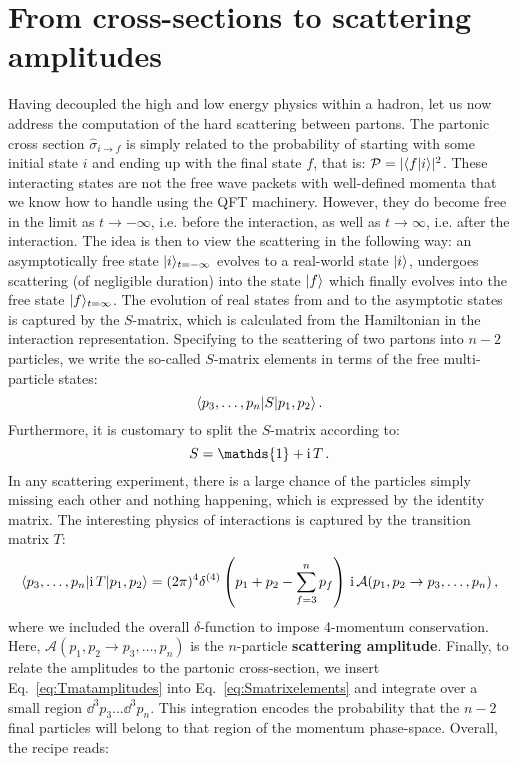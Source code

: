 \documentclass[main.tex]{subfiles}
\begin{document}
\section{From cross-sections to scattering amplitudes} \label{sec:fromcrosssectoamps}
Having decoupled the high and low energy physics within a hadron, let us now address the computation of the hard scattering between partons. The partonic cross section $\hat{\sigma}_{i\rightarrow f}$ is simply related to the probability of starting with some initial state $i$ and ending up with the final state $f$, that is: $\mathcal{P} = |\langle f|i \rangle|^2$. These interacting states are not the free wave packets with well-defined momenta that we know how to handle using the QFT machinery. However, they do become free in the limit as $t\rightarrow -\infty$, i.e. before the interaction, as well as $t \rightarrow \infty$, i.e. after the interaction. The idea is then to view the scattering in the following way: an asymptotically free state $|i \rangle_{t=-\infty}$ evolves to a real-world state $|i \rangle$, undergoes scattering (of negligible duration) into the state $|f \rangle$ which finally evolves into the free state $|f \rangle_{t=\infty}$. The evolution of real states from and to the asymptotic states is captured by the $S$-matrix, which is calculated from the Hamiltonian in the interaction representation. Specifying to the scattering of two partons into $n-2$ particles, we write the so-called $S$-matrix elements in terms of the free multi-particle states:
\begin{equation} \label{eq:Smatrixelements}
    \langle p_3, \ldots, p_n|S|p_1,p_2 \rangle\,.
\end{equation}
Furthermore, it is customary to split the $S$-matrix according to:
\begin{equation} \label{eq:StoiT}
    S = \mathds{1} + \i T\,.
\end{equation}
In any scattering experiment, there is a large chance of the particles simply missing each other and nothing happening, which is expressed by the identity matrix. The interesting physics of interactions is captured by the transition matrix $T$:
\begin{equation} \label{eq:Tmatamplitudes}
    \langle p_3, \ldots, p_n|\mathrm{i}\, T|p_1,p_2 \rangle = (2\pi)^4 \delta^{(4)}\left(p_1+p_2 - \sum_{f=3}^n p_f\right)\, \mathrm{i}\, \mathcal{A} (p_1,p_2 \rightarrow p_3, \ldots, p_n) \,,
\end{equation}
where we included the overall $\delta$-function to impose 4-momentum conservation. Here, $\mathcal{A} (p_1,p_2 \rightarrow p_3, \ldots, p_n)$ is the $n$-particle \textbf{scattering amplitude}. Finally, to relate the amplitudes to the partonic cross-section, we insert Eq.~\ref{eq:Tmatamplitudes} into Eq.~\ref{eq:Smatrixelements} and integrate over a small region $\dd^3p_3 \ldots \dd^3 p_n$. This integration encodes the probability that the $n-2$ final particles will belong to that region of the momentum phase-space. Overall, the recipe reads:
\end{document}
